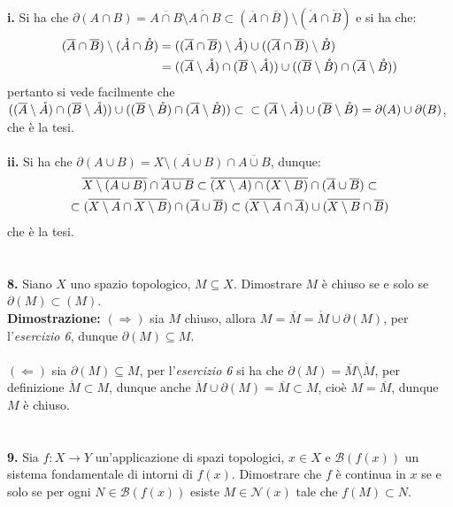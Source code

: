 \documentclass{article}
\begin{document}
\textbf{i.} Si ha che $\partial (A \cap B) = \overline{A \cap B} \setminus \mathring{A \cap B} \subset (\overline{A} \cap \overline{B}) \setminus (\mathring{A} \cap \mathring{B})$ e si ha che:
\begin{align}
    (\overline{A} \cap \overline{B}) \setminus (\mathring{A} \cap \mathring{B}) &= ((\overline{A} \cap \overline{B}) \setminus \mathring{A}) \cup ((\overline{A} \cap \overline{B}) \setminus \mathring{B}) \notag \\
    &= ((\overline{A} \setminus \mathring{A}) \cap (\overline{B} \setminus \mathring{A})) \cup ((\overline{B} \setminus \mathring{B}) \cap (\overline{A} \setminus \mathring{B})) \notag
\end{align}
pertanto si vede facilmente che $((\overline{A} \setminus \mathring{A}) \cap (\overline{B} \setminus \mathring{A})) \cup ((\overline{B} \setminus \mathring{B}) \cap (\overline{A} \setminus \mathring{B})) \subset\\\subset (\overline{A} \setminus \mathring{A}) \cup (\overline{B} \setminus \mathring{B}) = \partial (A) \cup \partial (B)$, che è la tesi. \\ \\
\textbf{ii.} Si ha che $\partial (A \cup B) = \overline{X \setminus (A \cup B)} \cap \overline{A \cup B}$, dunque:
\begin{gather}
    \overline{X \setminus (A \cup B)} \cap \overline{A \cup B} \subset \overline{(X \setminus A) \cap (X \setminus B)} \cap (\overline{A} \cup \overline{B}) \subset \notag \\
    \subset (\overline{X \setminus A} \cap \overline{X \setminus B}) \cap (\overline{A} \cup \overline{B}) \subset (\overline{X \setminus A} \cap \overline{A}) \cup (\overline{X \setminus B} \cap \overline{B}) \notag
\end{gather}
che è la tesi. \\ \\ \\
\textbf{8.} Siano $X$ uno spazio topologico, $M \subseteq X$. Dimostrare $M$ è chiuso se e solo se $\partial(M) \subset (M)$. \\

\textbf{Dimostrazione:} $(\Rightarrow)$ sia $M$ chiuso, allora $M = \overline{M} = \mathring{M} \cup \partial(M)$, per l'\textit{esercizio 6}, dunque $\partial(M) \subseteq M$. \\ \\
$(\Leftarrow)$ sia $\partial(M) \subseteq M$, per l'\textit{esercizio 6} si ha che $\partial(M) = \overline{M} \setminus \mathring{M}$, per definizione $\mathring{M} \subset M$, dunque anche $\mathring{M} \cup \partial(M) = \overline{M} \subset M$, cioè $M = \overline{M}$, dunque $M$ è chiuso.  \\ \\ \\
\textbf{9.} Sia $f : X \longrightarrow Y$ un'applicazione di spazi topologici, $x \in X$ e $\mathcal{B}(f(x))$ un sistema fondamentale di intorni di $f(x)$. Dimostrare che $f$ è continua in $x$ se e solo se per ogni $N \in \mathcal{B}(f(x))$ esiste $M \in \mathcal{N}(x)$ tale che $f(M) \subset N$. \\
\end{document}
